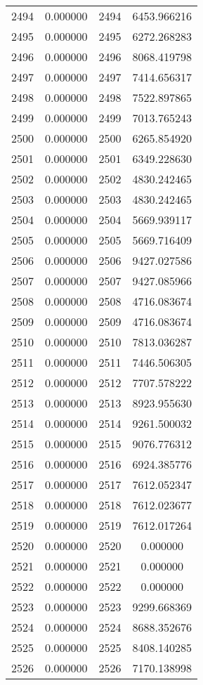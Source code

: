 \documentclass[12pt]{article}
\begin{document}
\begin{longtable}{@{}cccc@{}}
2494 & 0.000000 & 2494 & 6453.966216 \\
2495 & 0.000000 & 2495 & 6272.268283 \\
2496 & 0.000000 & 2496 & 8068.419798 \\
2497 & 0.000000 & 2497 & 7414.656317 \\
2498 & 0.000000 & 2498 & 7522.897865 \\
2499 & 0.000000 & 2499 & 7013.765243 \\
2500 & 0.000000 & 2500 & 6265.854920 \\
2501 & 0.000000 & 2501 & 6349.228630 \\
2502 & 0.000000 & 2502 & 4830.242465 \\
2503 & 0.000000 & 2503 & 4830.242465 \\
2504 & 0.000000 & 2504 & 5669.939117 \\
2505 & 0.000000 & 2505 & 5669.716409 \\
2506 & 0.000000 & 2506 & 9427.027586 \\
2507 & 0.000000 & 2507 & 9427.085966 \\
2508 & 0.000000 & 2508 & 4716.083674 \\
2509 & 0.000000 & 2509 & 4716.083674 \\
2510 & 0.000000 & 2510 & 7813.036287 \\
2511 & 0.000000 & 2511 & 7446.506305 \\
2512 & 0.000000 & 2512 & 7707.578222 \\
2513 & 0.000000 & 2513 & 8923.955630 \\
2514 & 0.000000 & 2514 & 9261.500032 \\
2515 & 0.000000 & 2515 & 9076.776312 \\
2516 & 0.000000 & 2516 & 6924.385776 \\
2517 & 0.000000 & 2517 & 7612.052347 \\
2518 & 0.000000 & 2518 & 7612.023677 \\
2519 & 0.000000 & 2519 & 7612.017264 \\
2520 & 0.000000 & 2520 & 0.000000 \\
2521 & 0.000000 & 2521 & 0.000000 \\
2522 & 0.000000 & 2522 & 0.000000 \\
2523 & 0.000000 & 2523 & 9299.668369 \\
2524 & 0.000000 & 2524 & 8688.352676 \\
2525 & 0.000000 & 2525 & 8408.140285 \\
2526 & 0.000000 & 2526 & 7170.138998 \\

\end{longtable}
\end{document}
